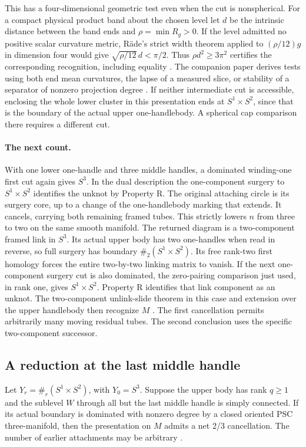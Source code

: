 \documentclass[11pt,letterpaper]{article}
\numberwithin{equation}{section}
\begin{document}
This has a four-dimensional geometric test even when the cut is
nonspherical. For a compact physical product band about the chosen
level let \(d\) be the intrinsic distance between the band ends and
\(\rho=\min R_g>0\). If the level admitted no positive scalar
curvature metric, R\"ade's strict width theorem applied to
\((\rho/12)g\) in dimension four would give
\(\sqrt{\rho/12}\,d<\pi/2\). Thus \(\rho d^2\ge3\pi^2\) certifies the
corresponding recognition, including equality
\cite[Corollary 2.25]{Raede2022Bands}. The companion paper derives
tests using both end mean curvatures, the lapse of a measured slice,
or stability of a separator of nonzero projection degree
\cite{Baker2026HandleCuts}. If neither intermediate cut is accessible,
enclosing the whole lower cluster in this presentation ends at
\(S^1\times S^2\), since that is the boundary of the actual upper
one-handlebody. A spherical cap comparison there requires a different
cut.

\paragraph{The next count.}
With one lower one-handle and three middle handles, a dominated
winding-one first cut again gives \(S^3\). In the dual description the
one-component surgery to \(S^1\times S^2\) identifies the unknot by
Property R. The original attaching circle is its surgery core, up to
a change of the one-handlebody marking that extends. It cancels,
carrying both remaining framed tubes. This strictly lowers \(n\)
from three to two on the same smooth manifold. The returned diagram is
a two-component framed link in \(S^3\). Its actual upper body has two
one-handles when read in reverse, so full surgery has boundary
\(\#_2(S^1\times S^2)\). Its free rank-two first homology forces the
entire two-by-two linking matrix to vanish. If the next one-component
surgery cut is also dominated, the zero-pairing comparison just used,
in rank one, gives \(S^1\times S^2\). Property R identifies that link
component as an unknot. The two-component unlink-slide theorem in
this case and extension over the upper handlebody then recognize \(M\)
\cite[Proposition 3.2]{GompfScharlemannThompson2010}%
\cite{LaudenbachPoenaru1972Handlebodies,Baker2026HandleCuts}.
The first cancellation permits arbitrarily many moving residual tubes.
The second conclusion uses the specific two-component successor.


\subsection{A reduction at the last middle handle}
Let \(Y_r=\#_r(S^1\times S^2)\), with \(Y_0=S^3\). Suppose the
upper body has rank \(q\ge1\) and the sublevel \(W\) through all but
the last middle handle is simply connected. If its actual boundary is
dominated with nonzero degree by a closed oriented PSC three-manifold,
then the presentation on \(M\) admits a net 2/3 cancellation.
The number of earlier attachments may be arbitrary
\cite{Baker2026HandleCuts}.
\end{document}
